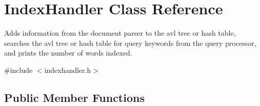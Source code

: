 \hypertarget{class_index_handler}{\section{Index\-Handler Class Reference}
\label{class_index_handler}
}


Adds information from the document parser to the avl tree or hash table, searches the avl tree or hash table for query keywords from the query processor, and prints the number of words indexed.  




{\ttfamily \#include $<$indexhandler.\-h$>$}

\subsection*{Public Member Functions}
